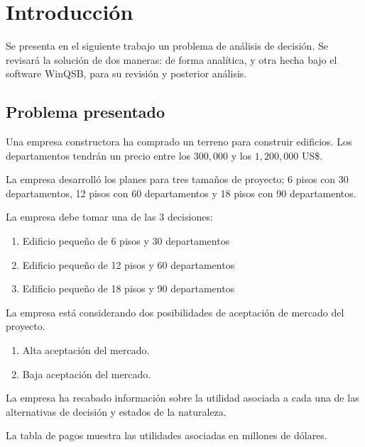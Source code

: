 \section{Introducción}
Se presenta en el siguiente trabajo un problema de análisis de decisión. Se revisará la solución de dos maneras: de forma analítica, y otra hecha bajo el software WinQSB, para su revisión y posterior análisis.

\subsection{Problema presentado}
Una empresa constructora ha comprado un terreno para construir edificios. Los departamentos tendrán un precio entre los $300,000$ y los $1,200,000$ US\$.

La empresa desarrolló los planes para tres tamaños de proyecto; 6 pisos con 30 departamentos, 12 pisos con 60 departamentos y 18 pisos con 90 departamentos.

La empresa debe tomar una de las 3 decisiones:

\begin{enumerate}
    \item Edificio pequeño de 6 pisos y 30 departamentos
    \item Edificio pequeño de 12 pisos y 60 departamentos
    \item Edificio pequeño de 18 pisos y 90 departamentos
\end{enumerate}

La empresa está considerando dos posibilidades de aceptación de mercado del proyecto.

\begin{enumerate}
    \item Alta aceptación del mercado.
    \item Baja aceptación del mercado.
\end{enumerate}

La empresa ha recabado información sobre la utilidad asociada a cada una de las alternativas de decisión y estados de la naturaleza.

La tabla de pagos muestra las utilidades asociadas en millones de dólares.


